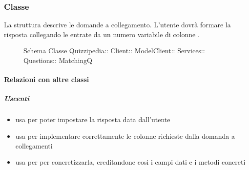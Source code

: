 \subsubsection{Classe }
La struttura descrive le domande a collegamento. L'utente dovrà formare la risposta collegando le entrate da un numero variabile di colonne .
\begin{figure}[H]
\centering
\noindent{}
\caption[Schema Classe MatchingQ]{Schema Classe Quizzipedia:: Client:: ModelClient:: Services:: Questions:: MatchingQ}
\end{figure}
\paragraph{Relazioni con altre classi}
\subparagraph{Uscenti}
\begin{itemize}
\item usa  per poter impostare la risposta data dall'utente
\item usa  per implementare correttamente le colonne richieste dalla domanda a collegamenti
\item usa  per per concretizzarla, ereditandone così i campi dati e i metodi concreti
\end{itemize}
